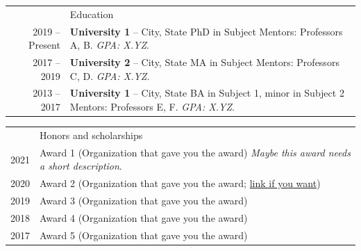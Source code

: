 \documentclass[letterpaper, 11pt]{article}
\newcommand{\headingfont}{\Large\color{OliveGreen}}
\newenvironment{SectionTable}[1]{
	\renewcommand*{\arraystretch}{1.4}
	\setlength{\tabcolsep}{10pt}
	\begin{longtable}{Rp{5.2in}} & #1 \\}
{\end{longtable}\vspace{-.3cm}}
\begin{document}
\begin{SectionTable}{\headingfont Education}
2019 -- Present & 
\textbf{University 1} -- City, State \newline
PhD in Subject \newline 
Mentors: Professors A, B. \textit{GPA: X.YZ}. \\

2017 -- 2019 & 
\textbf{University 2} -- City, State \newline
MA in Subject \newline 
Mentors: Professors C, D. \textit{GPA: X.YZ}. \\

2013 -- 2017 & 
\textbf{University 1} -- City, State \newline
BA in Subject 1, minor in Subject 2\newline 
Mentors: Professors E, F. \textit{GPA: X.YZ}. \\



\end{SectionTable}


\begin{SectionTable}{\headingfont Honors and scholarships}
2021 & 
Award 1 (Organization that gave you the award)\newline
\textit{Maybe this award needs a short description}. \\

2020 &
Award 2 (Organization that gave you the award; \href{https://en.wikibooks.org/wiki/LaTeX/Hyperlinks}{link if you want}) \\

2019 &
Award 3 (Organization that gave you the award) \\

2018 &
Award 4 (Organization that gave you the award) \\

2017 &
Award 5 (Organization that gave you the award)
\end{SectionTable}
\end{document}

